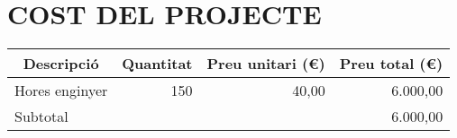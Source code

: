 \chapter{\uppercase{Cost del projecte}} %

\begin{table}[H]
  \begin{center}
    \begin{tabularx} {\textwidth} {|X|r|r|r|} \hline
  \multicolumn{1}{|c|}{Descripció} &  \multicolumn{1}{c|}{Quantitat} & \multicolumn{1}{c|}{Preu unitari (€)} &  \multicolumn{1}{c|}{Preu total (€)}\\ \hline \hline
Hores enginyer & 150 & 40,00 & 6.000,00 \\ \hline \hline
    \multicolumn{3}{|l}{Subtotal} & 6.000,00 \\ \hline

    \end{tabularx}%
  \end{center}
  \label{tab:addlabel}%
\end{table}%

\clearpage